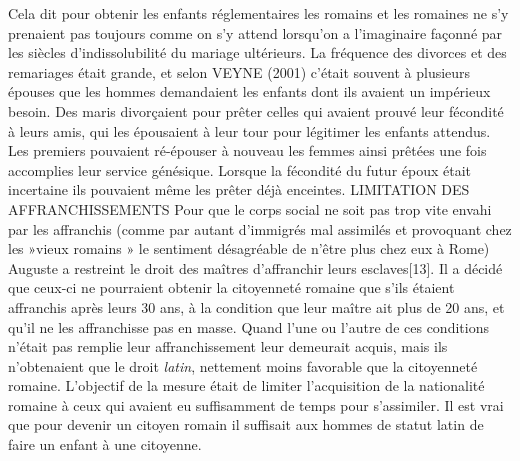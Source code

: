 Cela dit pour obtenir les enfants réglementaires les romains et les romaines ne s'y prenaient pas toujours comme on s'y attend lorsqu'on a l'imaginaire façonné par les siècles d'indissolubilité du mariage ultérieurs. La fréquence des divorces et des remariages était grande, et selon VEYNE (2001) c'était souvent à plusieurs épouses que les hommes demandaient les enfants dont ils avaient un impérieux besoin. Des maris divorçaient pour prêter celles qui avaient prouvé leur fécondité à leurs amis, qui les épousaient à leur tour pour légitimer les enfants attendus. Les premiers pouvaient ré-épouser à nouveau les femmes ainsi prêtées une fois accomplies leur service génésique. Lorsque la fécondité du futur époux était incertaine ils pouvaient même les prêter déjà enceintes. 
LIMITATION DES AFFRANCHISSEMENTS 
 Pour que le corps social ne soit pas trop vite envahi par les affranchis (comme par autant d'immigrés mal assimilés et provoquant chez les »vieux romains » le sentiment désagréable de n'être plus chez eux à Rome) Auguste a restreint le droit des maîtres d'affranchir leurs esclaves[13]. Il a décidé que ceux-ci ne pourraient obtenir la citoyenneté romaine que s'ils étaient affranchis après leurs 30 ans, à la condition que leur maître ait plus de 20 ans, et qu'il ne les affranchisse pas en masse. 
 Quand l'une ou l'autre de ces conditions n'était pas remplie leur affranchissement leur demeurait acquis, mais ils n'obtenaient que le droit \emph{latin}, nettement moins favorable que la citoyenneté romaine. L'objectif de la mesure était de limiter l'acquisition de la nationalité romaine à ceux qui avaient eu suffisamment de temps pour s'assimiler. Il est vrai que pour devenir un citoyen romain il suffisait aux hommes de statut latin de faire un enfant à une citoyenne. 
 

